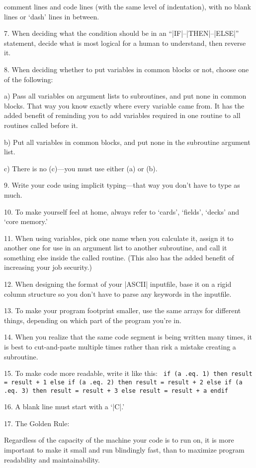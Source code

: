   comment lines and code lines (with the same level of indentation), with 
   no blank lines or `dash' lines in between.
\item{7.} When deciding what the condition should be in an
``|IF|--|THEN|--|ELSE|'' statement, decide what is most logical for a
human to understand, then reverse it.
\item{8.} When deciding whether to put variables in common blocks or not, choose
   one of the following:%
      \startlist%
      \item{a)} Pass all variables on argument lists to subroutines, and put none
         in common blocks.  That way you know exactly where every variable
         came from.  It has the added benefit of reminding you to add 
         variables required in one routine to all routines called before it.
      \item{b)} Put all variables in common blocks, and put none in the
      subroutine argument list.
      \item{c)} There is no (c)---you must use either (a) or (b).
      \endlist
\item{9.} Write your code using implicit typing---that way you don't have to type
   as much.
\item{10.} To make yourself feel at home, always refer to `cards', `fields',
`decks' and `core memory.'
\item{11.} When using variables, pick one name when you calculate it, assign
    it to another one for use in an argument list to another subroutine,
    and call it something else inside the called routine.
    (This also has the added benefit of increasing your job security.)
\item{12.} When designing the format of your |ASCII| inputfile, base it on
a rigid column structure so you don't have to parse any keywords in 
the inputfile.
\item{13.} To make your program footprint smaller, use the same arrays for
different things, depending on which part of the program you're in.
\item{14.} When you realize that the same code segment is being written many
    times, it is best to cut-and-paste multiple times rather than risk a 
    mistake creating a subroutine.
\item{15.} To make code more readable, write it like this:
{\smallskip\narrower\parskip=2pt\obeylines\tt%
    if (a .eq.\ 1) then
    \quad result = result + 1
    else if (a .eq.\ 2) then
    \quad result = result + 2
    else if (a .eq.\ 3) then
    \quad result = result + 3
    else
    \quad result = result + a
    endif\smallskip}%
\item{16.} A blank line must start with a `|C|.'
\item{17.} The Golden Rule: 
\item{} Regardless of the capacity of the machine your code is to run on,
      it is more important to make it small and run blindingly fast,
      than to maximize program readability and maintainability.
\endlist

\bye
